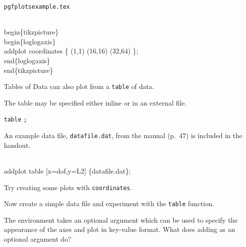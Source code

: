

\begin{frame}[fragile]{\texttt{pgfplotsexample.tex}}
  \begin{semiverbatim}
    \alert<2>{\\begin\{tikzpicture\}}
      \alert<3>{\\begin\{loglogaxis\}}
        \alert<4>{\\addplot} \alert<5>{coordinates} \alert<6>{\{
          (1,1)
          (16,16)
          (32,64)
        \}}\alert<7>{;}
      \alert<3>{\\end\{loglogaxis\}}
    \alert<2>{\\end\{tikzpicture\}}
  \end{semiverbatim}
\end{frame}

\begin{frame}[fragile]{Tables of Data}
  \pgfplots{} can also plot from a \verb|table| of data.

  The table may be specified either inline or in an external file.

   \alert<2,6>{\texttt{table}} \alert<3,7-9>{} \alert<4,10>{}\texttt{;}

  An example data file, \alert<10>{\texttt{datafile.dat}}, from the manual (p.~47) is included in the handout.

  \begin{semiverbatim}
    \\addplot \alert<6>{table} \alert<7>{[}\alert<7,8>{x=dof}\alert<7>{,}\alert<7,9>{y=L2}\alert<7>{]} \alert<10>{\{datafile.dat\}};
  \end{semiverbatim}

\end{frame}



\begin{exercise}
  Try creating some plots with  \texttt{coordinates}.

  Now create a simple data file and experiment with the \texttt{table} function.

  The  environment takes an optional argument which can be used to specify the appearance of the axes and plot in key-value format.
  What does adding  as an optional argument do?
\end{exercise}

